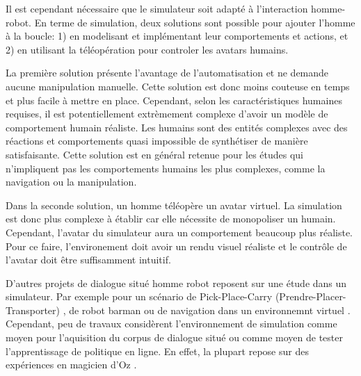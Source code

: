 \documentclass[a4paper,11pt,twoside]{StyleThese}
\begin{document}
Il est cependant nécessaire que le simulateur soit adapté à l'interaction homme-robot. 
En terme de simulation, deux solutions sont possible pour ajouter l'homme à la boucle: 1) en modelisant et implémentant leur comportements et actions, et 2) en utilisant la téléopération pour controler les avatars humains.

La première solution présente l'avantage de l'automatisation et ne demande aucune manipulation manuelle. Cette solution est donc moins couteuse en temps et plus facile à mettre en place. Cependant, selon les caractéristiques humaines requises, il est potentiellement extrèmement complexe d'avoir un modèle de comportement humain réaliste. Les humains sont des entités complexes avec des réactions et comportements quasi impossible de synthétiser de manière satisfaisante. Cette solution est en général retenue pour les études qui n'impliquent pas les comportements humains les plus complexes, comme la navigation ou la manipulation.

Dans la seconde solution, un homme téléopère un avatar virtuel. La simulation est donc plus complexe à établir car elle nécessite de monopoliser un humain. Cependant, l'avatar du simulateur aura un comportement beaucoup plus réaliste. Pour ce faire, l'environement doit avoir un rendu visuel réaliste et le contrôle de l'avatar doit être suffisamment intuitif.

D'autres projets de dialogue situé homme robot reposent sur une étude dans un simulateur. Par exemple pour un scénario de Pick-Place-Carry (Prendre-Placer-Transporter) \cite{Lucignano13}, de robot barman \cite{stiefelhagen07} ou de navigation dans un environnemnt virtuel \cite{byron06}. Cependant, peu de travaux considèrent l'environnement de simulation comme moyen pour l'aquisition du corpus de dialogue situé ou comme moyen de tester l'apprentissage de politique en ligne.
%
En effet, la plupart repose sur des expériences en magicien d'Oz \cite{prommer06,stiefelhagen07,rieser08}. 
\end{document}
